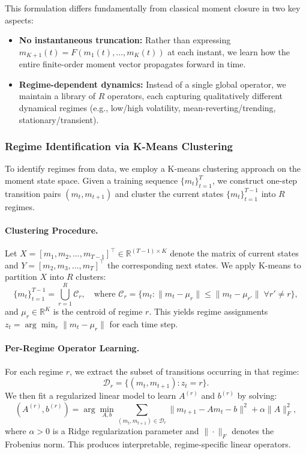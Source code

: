 \documentclass[journal, onecolumn]{IEEEtran}
\begin{document}
This formulation differs fundamentally from classical moment closure in two key aspects:
\begin{itemize}
    \item \textbf{No instantaneous truncation:} Rather than expressing $m_{K+1}(t) = F(m_1(t), \dots, m_K(t))$ at each instant, we learn how the entire finite-order moment vector propagates forward in time.
    \item \textbf{Regime-dependent dynamics:} Instead of a single global operator, we maintain a library of $R$ operators, each capturing qualitatively different dynamical regimes (e.g., low/high volatility, mean-reverting/trending, stationary/transient).
\end{itemize}

\subsubsection{Regime Identification via K-Means Clustering}

To identify regimes from data, we employ a K-means clustering approach on the moment state space. Given a training sequence $\{m_t\}_{t=1}^T$, we construct one-step transition pairs $(m_t, m_{t+1})$ and cluster the current states $\{m_t\}_{t=1}^{T-1}$ into $R$ regimes.

\paragraph{Clustering Procedure.}
Let $X = [m_1, m_2, \dots, m_{T-1}]^\top \in \mathbb{R}^{(T-1) \times K}$ denote the matrix of current states and $Y = [m_2, m_3, \dots, m_T]^\top$ the corresponding next states. We apply K-means to partition $X$ into $R$ clusters:
\begin{equation}
\{m_t\}_{t=1}^{T-1} = \bigcup_{r=1}^R \mathcal{C}_r, \quad \text{where } \mathcal{C}_r = \{m_t : \|m_t - \mu_r\| \le \|m_t - \mu_{r'}\| \; \forall r' \neq r\},
\end{equation}
and $\mu_r \in \mathbb{R}^K$ is the centroid of regime $r$. This yields regime assignments $z_t = \arg\min_{r} \|m_t - \mu_r\|$ for each time step.

\paragraph{Per-Regime Operator Learning.}
For each regime $r$, we extract the subset of transitions occurring in that regime:
\begin{equation}
\mathcal{D}_r = \{(m_t, m_{t+1}) : z_t = r\}.
\end{equation}
We then fit a regularized linear model to learn $A^{(r)}$ and $b^{(r)}$ by solving:
\begin{equation}
(A^{(r)}, b^{(r)}) = \arg\min_{A, b} \sum_{(m_t, m_{t+1}) \in \mathcal{D}_r} \|m_{t+1} - A m_t - b\|^2 + \alpha \|A\|_F^2,
\label{eq:ridge_per_regime}
\end{equation}
where $\alpha > 0$ is a Ridge regularization parameter and $\|\cdot\|_F$ denotes the Frobenius norm. This produces interpretable, regime-specific linear operators.
\end{document}
